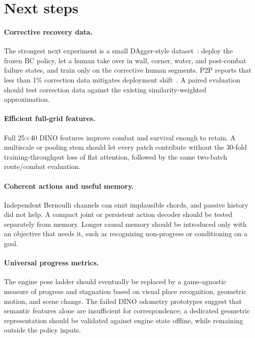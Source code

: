 \documentclass[11pt]{article}
\newcommand{\x}{\ensuremath{\times}}
\begin{document}
\section{Next steps}\label{sec:future}

\paragraph{Corrective recovery data.} The strongest next experiment is a small DAgger-style dataset~\cite{dagger}: deploy the frozen BC policy, let a human take over in wall, corner, water, and post-combat failure states, and train only on the corrective human segments. P2P reports that less than 1\% correction data mitigates deployment shift~\cite{p2p}. A paired evaluation should test correction data against the existing similarity-weighted approximation.

\paragraph{Efficient full-grid features.} Full 25\x40 DINO features improve combat and survival enough to retain. A multiscale or pooling stem should let every patch contribute without the 30-fold training-throughput loss of flat attention, followed by the same two-batch route/combat evaluation.

\paragraph{Coherent actions and useful memory.} Independent Bernoulli channels can emit implausible chords, and passive history did not help. A compact joint or persistent action decoder should be tested separately from memory. Longer causal memory should be introduced only with an objective that needs it, such as recognizing non-progress or conditioning on a goal.

\paragraph{Universal progress metrics.} The engine pose ladder should eventually be replaced by a game-agnostic measure of progress and stagnation based on visual place recognition, geometric motion, and scene change. The failed DINO odometry prototypes suggest that semantic features alone are insufficient for correspondence; a dedicated geometric representation should be validated against engine state offline, while remaining outside the policy inputs.
\end{document}

